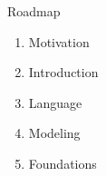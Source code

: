 
\begin{frame}{Roadmap}
  \vfill
  \begin{enumerate}
  \bigskip
  \bigskip
  \item Motivation
  \pause
  \bigskip
  \item Introduction
  \pause
  \bigskip
  \item Language
  \pause
  \bigskip
  \item Modeling
  \pause
  \bigskip
  \item Foundations
  \end{enumerate}
  \vfill
\end{frame}

%
